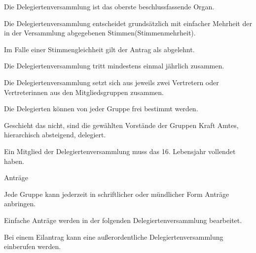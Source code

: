 \begin{legal}
\begin{legal}
            \item Die Delegiertenversammlung ist das oberste beschlussfassende Organ.
            \item Die Delegiertenversammlung entscheidet grundsätzlich mit einfacher Mehrheit der 
                  in der Versammlung abgegebenen Stimmen(Stimmenmehrheit).
            \item Im Falle einer Stimmengleichheit gilt der Antrag als abgelehnt.
            \item Die Delegiertenversammlung tritt mindestens einmal jährlich zusammen.
            \item Die Delegiertenversammlung setzt sich aus jeweils zwei Vertretern oder 
                  Vertreterinnen aus den Mitgliedsgruppen zusammen.
                \begin{legal}
                    \item Die Delegierten können von jeder Gruppe frei bestimmt werden.
                    \item Geschieht das nicht, sind die gewählten Vorstände der Gruppen Kraft Amtes, 
                          hierarchisch absteigend, delegiert.
                \end{legal}
            \item Ein Mitglied der Delegiertenversammlung muss das 16. Lebensjahr vollendet haben.
            \item Anträge
                \begin{legal}
                    \item Jede Gruppe kann jederzeit in schriftlicher oder mündlicher Form Anträge 
                          anbringen.
                    \item Einfache Anträge werden in der folgenden Delegiertenversammlung 
                          bearbeitet.
                    \item Bei einem Eilantrag kann eine außerordentliche Delegiertenversammlung 
                          einberufen werden.
                        \begin{legal}

\end{legal}
\end{legal}
\end{legal}
\end{legal}
